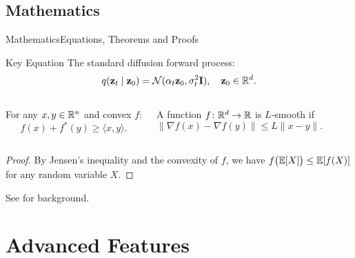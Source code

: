 \documentclass[
11pt,hyperref={pdfauthor=whatever}
]{beamer}
\begin{document}
\subsection{Mathematics}
\begin{frame}{Mathematics}{Equations, Theorems and Proofs}
\begin{block}{Key Equation}
    The standard diffusion forward process:
    \[
        q(\mathbf{z}_t \mid \mathbf{z}_0) = \mathcal{N}(\alpha_t \mathbf{z}_0, \sigma_t^2 \mathbf{I}), \quad \mathbf{z}_0 \in \mathbb{R}^d.
    \]
\end{block}

\vspace{-0.15cm}
\begin{columns}[T,onlytextwidth]
    \begin{theorem}
        For any $x, y \in \mathbb{R}^n$ and convex $f$:
        \[
            f(x) + f^*(y) \geq \langle x, y \rangle.
        \]
    \end{theorem}

    \begin{definition}
        A function $f \colon \mathbb{R}^d \to \mathbb{R}$ is $L$-smooth if
        \[
            \|\nabla f(x) - \nabla f(y)\| \leq L\|x - y\|.
        \]
    \end{definition}
\end{columns}

\vspace{0.1cm}
\begin{proof}
    By Jensen's inequality and the convexity of $f$, we have $f\bigl(\mathbb{E}[X]\bigr) \leq \mathbb{E}[f(X)]$ for any random variable $X$. \qedhere
\end{proof}
\vspace{0.1cm}
{\footnotesize\textcolor{nipsgray}{See \cite{boyd2004convex,ho2020denoising,kingma2021variational} for background.}}
\end{frame}


\section{Advanced Features}
\end{document}
